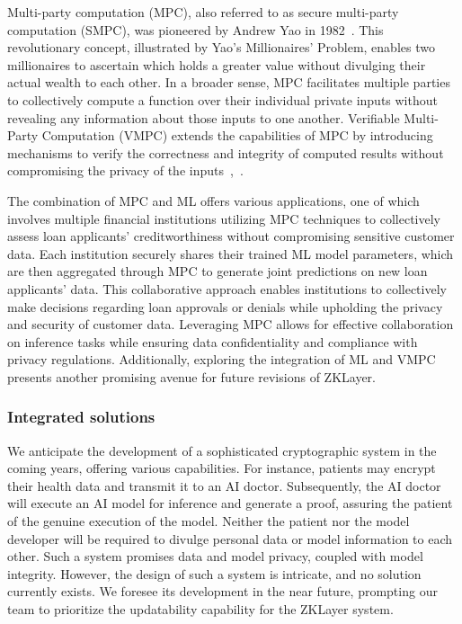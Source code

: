 \documentclass[conference]{IEEEtran}
\begin{document}
Multi-party computation (MPC), also referred to as secure multi-party computation (SMPC), was pioneered by Andrew Yao in 1982~\cite{Yao1982ProtocolsFS}. This revolutionary concept, illustrated by Yao's Millionaires' Problem, enables two millionaires to ascertain which holds a greater value without divulging their actual wealth to each other. In a broader sense, MPC facilitates multiple parties to collectively compute a function over their individual private inputs without revealing any information about those inputs to one another. Verifiable Multi-Party Computation (VMPC) extends the capabilities of MPC by introducing mechanisms to verify the correctness and integrity of computed results without compromising the privacy of the inputs~\cite{Schoenmakers2015UniversallyVM},~\cite{Laud2014VerifiableCI}.

The combination of MPC and ML offers various applications, one of which involves multiple financial institutions utilizing MPC techniques to collectively assess loan applicants' creditworthiness without compromising sensitive customer data. Each institution securely shares their trained ML model parameters, which are then aggregated through MPC to generate joint predictions on new loan applicants' data. This collaborative approach enables institutions to collectively make decisions regarding loan approvals or denials while upholding the privacy and security of customer data. Leveraging MPC allows for effective collaboration on inference tasks while ensuring data confidentiality and compliance with privacy regulations. Additionally, exploring the integration of ML and VMPC presents another promising avenue for future revisions of ZKLayer.


\subsubsection{Integrated solutions}

We anticipate the development of a sophisticated cryptographic system in the coming years, offering various capabilities. For instance, patients may encrypt their health data and transmit it to an AI doctor. Subsequently, the AI doctor will execute an AI model for inference and generate a proof, assuring the patient of the genuine execution of the model. Neither the patient nor the model developer will be required to divulge personal data or model information to each other. Such a system promises data and model privacy, coupled with model integrity. However, the design of such a system is intricate, and no solution currently exists. We foresee its development in the near future, prompting our team to prioritize the updatability capability for the ZKLayer system.
\end{document}
